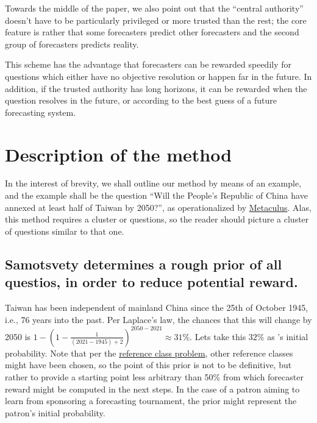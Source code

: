 \documentclass[]{article}
\begin{document}
Towards the middle of the paper, we also point out that the ``central
authority'' doesn't have to be particularly privileged or more trusted
than the rest; the core feature is rather that some forecasters predict
other forecasters and the second group of forecasters predicts reality.

This scheme has the advantage that forecasters can be rewarded speedily
for questions which either have no objective resolution or happen far in
the future. In addition, if the trusted authority has long horizons, it
can be rewarded when the question resolves in the future, or according
to the best guess of a future forecasting system.

\hypertarget{description-of-the-method}{%
\section{Description of the method}\label{description-of-the-method}}

In the interest of brevity, we shall outline our method by means of an
example, and the example shall be the question ``Will the People's
Republic of China have annexed at least half of Taiwan by 2050?'', as
operationalized by
\href{https://www.metaculus.com/questions/5320/chinese-annexation-of-most-of-taiwan-by-2050/}{Metaculus}.
Alas, this method requires a cluster or questions, so the reader should
picture a cluster of questions similar to that one.

\hypertarget{samotsvety-determines-a-rough-prior-of-all-questios-in-order-to-reduce-potential-reward.}{%
\subsection{Samotsvety determines a rough prior of all questios, in
order to reduce potential
reward.}\label{samotsvety-determines-a-rough-prior-of-all-questios-in-order-to-reduce-potential-reward.}}

Taiwan has been independent of mainland China since the 25th of October
1945, i.e., 76 years into the past. Per Laplace's law, the chances that
this will change by 2050 is
\(1-(1-\frac{1}{(2021-1945)+2})^{2050-2021} \approx 31\%\). Lets take
this \(32\%\) as 's initial probability. Note that per the
\href{https://en.wikipedia.org/wiki/Reference_class_problem}{reference
class problem}, other reference classes might have been chosen, so the
point of this prior is not to be definitive, but rather to provide a
starting point less arbitrary than 50\% from which forecaster reward
might be computed in the next steps. In the case of a patron aiming to
learn from sponsoring a forecasting tournament, the prior might
represent the patron's initial probability.
\end{document}
